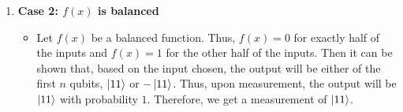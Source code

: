 \begin{example}
\begin{enumerate}
\begin{itemize}
        \item Let $f(x)=1$ for all $x \in \{0,1\}^2$. Thus, the output of the oracle will be:
        \begin{align*}
            &\frac{1}{2\sqrt{2}}(\ket{00}\ket{1}+\ket{01}\ket{1}+\ket{10}\ket{1}+\ket{11}\ket{1}-\ket{00}\ket{0}-\ket{01}\ket{0}-\ket{10}\ket{0}-\ket{11}\ket{0})\\
            &=\frac{-1}{2\sqrt{2}}(\ket{000}+\ket{010}+\ket{100}+\ket{110}-\ket{001}-\ket{011}-\ket{101}-\ket{111})\\
            &=\frac{-1}{2}(\ket{00}+\ket{01}+\ket{10}+\ket{11})\otimes \frac{\ket{0}-\ket{1}}{\sqrt{2}}
        \end{align*}
        Now we apply the Hadamard on the first $n$ qubits, and we get:
        \begin{align*}
            &(H^{\otimes 2}\otimes I)\frac{-1}{2}((\ket{00}+\ket{01}+\ket{10}+\ket{11})\otimes \ket{-})\\
            &=\frac{-1}{2}(H^{\otimes 2}\ket{00}+H^{\otimes 2}\ket{01}+H^{\otimes 2}\ket{10}+H^{\otimes 2}\ket{11})\otimes \ket{-}\\
            &=\frac{-1}{2}[\frac{1}{2}(\ket{00}+\ket{01}+\ket{10}+\ket{11})+\frac{1}{2}(\ket{00}-\ket{01}+\ket{10}-\ket{11})\\
            &\quad +\frac{1}{2}(\ket{00}+\ket{01}-\ket{10}-\ket{11})+\frac{1}{2}(\ket{00}-\ket{01}-\ket{10}+\ket{11})]\otimes \ket{-}
        \end{align*}
        Upon simplifying, we get:
        \[
            \frac{-1}{4}(4\ket{00})\otimes \ket{-}=\ket{00}\otimes -\ket{-}
        \]
        Thus, upon measurement, the output will be $\ket{00}$ with probability $1$. Therefore, we get a measurement of $\ket{00}$.
    \end{itemize}

    \item \textbf{Case 2: $f(x)$ is balanced}\\
    \begin{itemize}
        \item Let $f(x)$ be a balanced function. Thus, $f(x)=0$ for exactly half of the inputs and $f(x)=1$ for the other half of the inputs.  
        Then it can be shown that, based on the input chosen, the output will be either of the first $n$ qubits, $\ket{11}$ or $-\ket{11}$.  
        Thus, upon measurement, the output will be $\ket{11}$ with probability $1$. Therefore, we get a measurement of $\ket{11}$.
    \end{itemize}
\end{enumerate}
\end{example}

